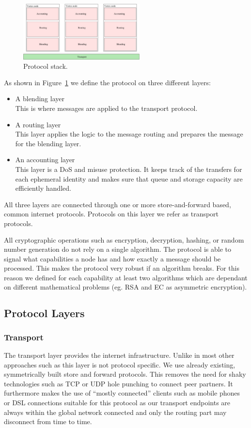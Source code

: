 \documentclass[9pt,journal,compsoc]{IEEEtran}
\begin{document}
\begin{figure}[!t]
\centering
\includegraphics[width=2.5in]{../inc/roughProtocolDesign}
\caption{Protocol stack.}
\label{fig:layers}
\end{figure}
As shown in Figure~\ref{fig:layers} we define the protocol on three different layers:
\begin{itemize}
	\item A blending layer\\
	      This is where messages are applied to the transport protocol. 
	\item A routing layer\\
	      This layer applies the logic to the message routing and prepares the message for the blending layer.
	\item An accounting layer\\
	      This layer is a DoS and misuse protection. It keeps track of the transfers for each ephemeral identity and makes sure that queue and storage capacity are efficiently handled.     
\end{itemize}
All three layers are connected through one or more store-and-forward based, common internet protocols. Protocols on this layer we refer as transport protocols.

All cryptographic operations such as encryption, decryption, hashing, or random number generation do not rely on a single algorithm. The protocol is able to signal what capabilities a node has and how exactly a message should be processed. This makes the protocol very robust if an algorithm breaks. For this reason we defined for each capability at least two algorithms which are dependant on different mathematical problems (eg. RSA and EC as asymmetric encryption). 

\subsection{Protocol Layers}
\subsubsection{Transport}
The transport layer provides the internet infrastructure. Unlike in most other approaches such as \cite{tor-design,sherwood-protocol,freenet} this layer is not protocol specific. We use already existing, symmetrically built store and forward protocols. This removes the need for shaky technologies such as TCP or UDP hole punching to connect peer partners. It furthermore makes the use of ``mostly connected'' clients such as mobile phones or DSL connections suitable for this protocol as our transport endpoints are always within the global network connected and only the routing part may disconnect from time to time. 
\end{document}
